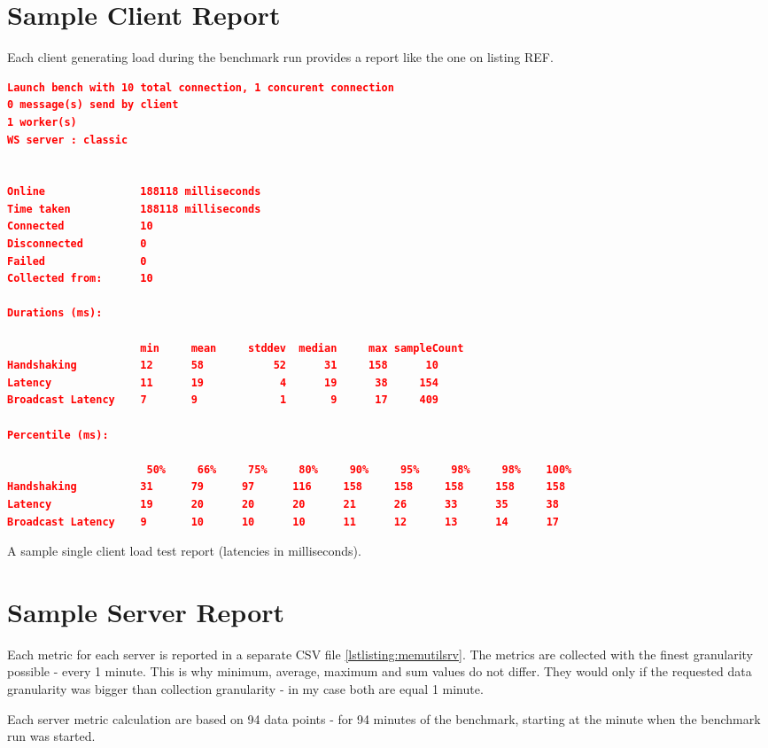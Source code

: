 \documentclass{uvamscse}
\begin{document}
\section{Sample Client Report}\label{Client Report}
Each client generating load during the benchmark run provides a report like the one on listing REF.

\begin{sourcecode}[H]
\begin{lstlisting}[language=json]
Launch bench with 10 total connection, 1 concurent connection
0 message(s) send by client
1 worker(s)
WS server : classic


Online               188118 milliseconds
Time taken           188118 milliseconds
Connected            10
Disconnected         0
Failed               0
Collected from:      10

Durations (ms):

                     min     mean     stddev  median     max sampleCount
Handshaking          12      58           52      31     158      10
Latency              11      19            4      19      38     154
Broadcast Latency    7       9             1       9      17     409

Percentile (ms):

                      50%     66%     75%     80%     90%     95%     98%     98%    100%
Handshaking          31      79      97      116     158     158     158     158     158
Latency              19      20      20      20      21      26      33      35      38
Broadcast Latency    9       10      10      10      11      12      13      14      17
\end{lstlisting}
\caption{A sample single client load test report (latencies in milliseconds).}
\label{lstlisting:prediction}
\end{sourcecode}

\section{Sample Server Report}
Each metric for each server is reported in a separate CSV file \ref{lstlisting:memutilsrv}. The metrics are collected with the finest granularity possible - every 1 minute. This is why minimum, average, maximum and sum values do not differ. They would only if the requested data granularity was bigger than collection granularity - in my case both are equal 1 minute.

Each server metric calculation are based on 94 data points - for 94 minutes of the benchmark, starting at the minute when the benchmark run was started.
\end{document}
